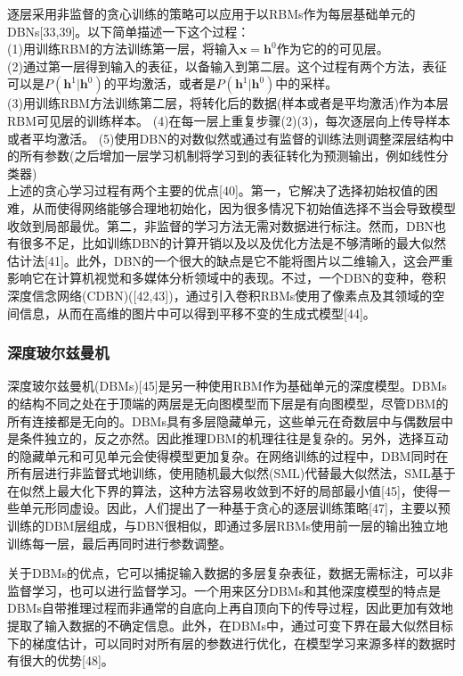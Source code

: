 \documentclass[a4paper]{article}
\begin{document}
逐层采用非监督的贪心训练的策略可以应用于以RBMs作为每层基础单元的DBNs[33,39]。以下简单描述一下这个过程：\\
(1)用训练RBM的方法训练第一层，将输入$\bm{x}=\bm{h}^{0}$作为它的的可见层。\\
(2)通过第一层得到输入的表征，以备输入到第二层。这个过程有两个方法，表征可以是$P(\bm{h}^{1}|\bm{h}^{0})$的平均激活，或者是$P(\bm{h}^{1}|\bm{h}^{0})$中的采样。\\
(3)用训练RBM方法训练第二层，将转化后的数据(样本或者是平均激活)作为本层RBM可见层的训练样本。
(4)在每一层上重复步骤(2)(3)，每次逐层向上传导样本或者平均激活。
(5)使用DBN的对数似然或通过有监督的训练法则调整深层结构中的所有参数(之后增加一层学习机制将学习到的表征转化为预测输出，例如线性分类器)\\
上述的贪心学习过程有两个主要的优点[40]。第一，它解决了选择初始权值的困难，从而使得网络能够合理地初始化，因为很多情况下初始值选择不当会导致模型收敛到局部最优。第二，非监督的学习方法无需对数据进行标注。然而，DBN也有很多不足，比如训练DBN的计算开销以及以及优化方法是不够清晰的最大似然估计法[41]。此外，DBN的一个很大的缺点是它不能将图片以二维输入，这会严重影响它在计算机视觉和多媒体分析领域中的表现。不过，一个DBN的变种，卷积深度信念网络(CDBN)([42,43])，通过引入卷积RBMs使用了像素点及其领域的空间信息，从而在高维的图片中可以得到平移不变的生成式模型[44]。
\subsubsection{深度玻尔兹曼机}
深度玻尔兹曼机(DBMs)[45]是另一种使用RBM作为基础单元的深度模型。DBMs的结构不同之处在于顶端的两层是无向图模型而下层是有向图模型，尽管DBM的所有连接都是无向的。DBMs具有多层隐藏单元，这些单元在奇数层中与偶数层中是条件独立的，反之亦然。因此推理DBM的机理往往是复杂的。另外，选择互动的隐藏单元和可见单元会使得模型更加复杂。在网络训练的过程中，DBM同时在所有层进行非监督式地训练，使用随机最大似然(SML)代替最大似然法，SML基于在似然上最大化下界的算法，这种方法容易收敛到不好的局部最小值[45]，使得一些单元形同虚设。因此，人们提出了一种基于贪心的逐层训练策略[47]，主要以预训练的DBM层组成，与DBN很相似，即通过多层RBMs使用前一层的输出独立地训练每一层，最后再同时进行参数调整。

关于DBMs的优点，它可以捕捉输入数据的多层复杂表征，数据无需标注，可以非监督学习，也可以进行监督学习。一个用来区分DBMs和其他深度模型的特点是DBMs自带推理过程而非通常的自底向上再自顶向下的传导过程，因此更加有效地提取了输入数据的不确定信息。此外，在DBMs中，通过可变下界在最大似然目标下的梯度估计，可以同时对所有层的参数进行优化，在模型学习来源多样的数据时有很大的优势[48]。
\end{document}
